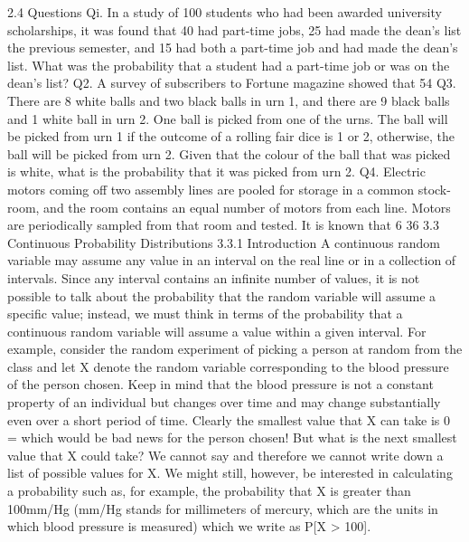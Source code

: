 2.4 Questions 
Qi. In a study of 100 students who had been awarded university scholarships, it was found that 40 had part-time jobs, 25 had made the dean's list the previous semester, and 15 had both a part-time job and had made the dean's list. What was the probability that a student had a part-time job or was on the dean's list? 
Q2. A survey of subscribers to Fortune magazine showed that 54%
Q3. There are 8 white balls and two black balls in urn 1, and there are 9 black balls and 1 white ball in urn 2. One ball is picked from one of the urns. The ball will be picked from urn 1 if the outcome of a rolling fair dice is 1 or 2, otherwise, the ball will be picked from urn 2. Given that the colour of the ball that was picked is white, what is the probability that it was picked from urn 
2. 
Q4. Electric motors coming off two assembly lines are pooled for storage in a common stock-room, and the room contains an equal number of motors from each line. Motors are periodically sampled from that room and tested. It is known that 6%
36 
3.3 Continuous Probability Distributions 
3.3.1 Introduction 
A continuous random variable may assume any value in an interval on the real line or in a collection of intervals. Since any interval contains an infinite number of values, it is not possible to talk about the probability that the random variable will assume a specific value; instead, we must think in terms of the probability that a continuous random variable will assume a value within a given interval. 
For example, consider the random experiment of picking a person at random from the class and let X denote the random variable corresponding to the blood pressure of the person chosen. Keep in mind that the blood pressure is not a constant property of an individual but changes over time and may change substantially even over a short period of time. Clearly the smallest value that X can take is 0 = which would be bad news for the person chosen! But what is the next smallest value that X could take? We cannot say and therefore we cannot write down a list of possible values for X. We might still, however, be interested in calculating a probability such as, for example, the probability that X is greater than 100mm/Hg (mm/Hg stands for millimeters of mercury, which are the units in which blood pressure is measured) which we write as P[X > 100]. 
